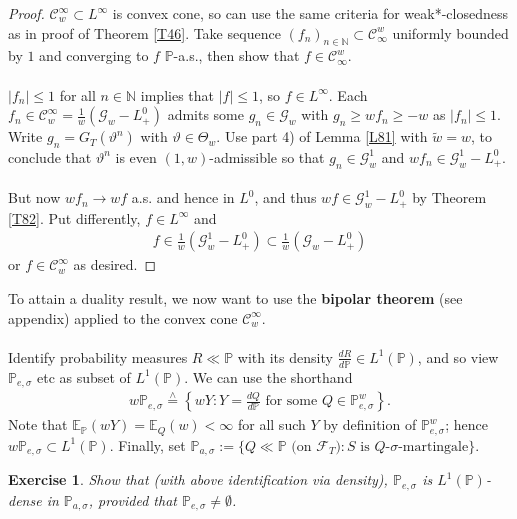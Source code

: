 \documentclass[12pt,a4paper, twoside]{article}
\newtheorem{exe}{Exercise}[section]
\theoremstyle{definition}
\newcommand{\EE}{\mathbb{E}} %
\newcommand{\PP}{\mathbb{P}} %
\newcommand{\teq}{\overset{\wedge}{=}}
\begin{document}
\begin{proof}
$\mathcal{C}_w^\infty \subset L^\infty$ is convex cone, so can use the same criteria for weak*-closedness as in proof of Theorem \ref{T46}. Take sequence $(f_n)_{n \in \mathbb{N}} \subset \mathcal{C}_\infty^w$ uniformly bounded by $1$ and converging to $f$ $\PP$-a.s., then show that $f \in \mathcal{C}_\infty^w$. \\
\\
$|f_n| \leq 1$ for all $n \in \mathbb{N}$ implies that $|f| \leq 1$, so $f \in L^\infty$. Each $f_n \in \mathcal{C}_w^\infty = \frac{1}{w}( \mathcal{G}_w-L_+^0)$ admits some $g_n \in \mathcal{G}_w$ with $g_n \geq wf_n \geq -w$ as $|f_n| \leq 1$. Write $g_n = G_T( \vartheta^n)$ with $\vartheta \in \Theta_w$. Use part 4) of Lemma \ref{L81} with $\widetilde{w}=w$, to conclude that $\vartheta^n$ is even $(1,w)$-admissible so that $g_n \in \mathcal{G}_w^1$ and $wf_n \in \mathcal{G}_w^1-L_+^0$. \\
\\
But now $wf_n \to wf$ a.s. and hence in $L^0$, and thus $wf \in \mathcal{G}_w^1-L_+^0$ by Theorem \ref{T82}. Put differently,  $f \in L^\infty$ and 
\begin{align*}
f \in \frac{1}{w}( \mathcal{G}_w^1- L_+^0) \subset \frac{1}{w}( \mathcal{G}_w-L_+^0)
\end{align*}
or $f \in \mathcal{C}_w^\infty$ as desired. 
\end{proof}
To attain a duality result, we now want to use the \textbf{bipolar theorem} (see appendix) applied to the convex cone $\mathcal{C}_w^\infty$. \\
\\
Identify probability measures $R \ll \PP$ with its density $\frac{dR}{d\PP} \in L^1(\PP)$, and so view $\PP_{e, \sigma}$ etc as subset of $L^1( \PP)$. We can use the shorthand 
\begin{align*}
w \PP_{e, \sigma} \teq \left\{ wY : Y = \frac{dQ}{d\PP} \text{ for some } Q \in \PP_{e, \sigma}^w\right\}.
\end{align*} 
Note that $\EE_\PP(wY)= \EE_Q(w) < \infty$ for all such $Y$ by definition of $\PP_{e, \sigma}^w$; hence $w \PP_{e, \sigma} \subset L^1 ( \PP)$. Finally, set $\PP_{a, \sigma}:= \{ Q \ll \PP \text{ (on $\mathcal{F}_T$)} : S \text{ is $Q$-$\sigma$-martingale}\}$.
\begin{exe} Show that (with above identification via density), $\PP_{e, \sigma}$ is $L^1(\PP)$-dense in $\PP_{a, \sigma}$, provided that $\PP_{e, \sigma} \neq \emptyset$.
\end{exe} 
\end{document}
